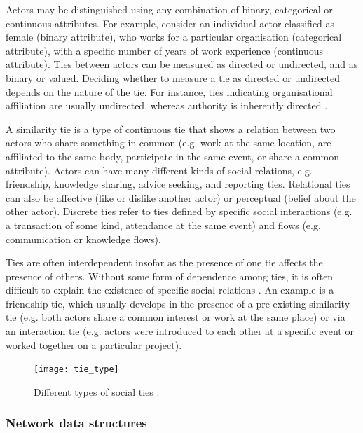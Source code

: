 Actors may be distinguished using any combination of binary, categorical or continuous attributes. For example, consider an individual actor classified as female (binary attribute), who works for a particular organisation (categorical attribute), with a specific number of years of work experience (continuous attribute). Ties between actors can be measured as directed or undirected, and as binary or valued. Deciding whether to measure a tie as directed or undirected depends on the nature of the tie. For instance, ties indicating organisational affiliation are usually undirected, whereas authority is inherently directed \citep{borgatti2013analyzing}. \medskip
 
 A similarity tie is a type of continuous tie that shows a relation between two actors who share something in common (e.g. work at the same location, are affiliated to the same body, participate in the same event, or share a common attribute). Actors can have many different kinds of social relations, e.g. friendship, knowledge sharing, advice seeking, and reporting ties. Relational ties can also be affective (like or dislike another actor) or perceptual (belief about the other actor). Discrete ties refer to ties defined by specific social interactions (e.g. a transaction of some kind, attendance at the same event) and flows (e.g. communication or knowledge flows). \medskip

Ties are often interdependent insofar as the presence of one tie affects the presence of others. Without some form of dependence among ties, it is often difficult to explain the existence of specific social relations \citep{lusher2013exponential}. An example is a friendship tie, which usually develops in the presence of a pre-existing similarity tie (e.g. both actors share a common interest or work at the same place) or via an interaction tie (e.g. actors were introduced to each other at a specific event or worked together on a particular project). \medskip

\begin{figure}
    \centering
    \texttt{[image: tie\_type]}
    \caption[Different types of social ties]{Different types of social ties \citep{borgatti2013analyzing}.}
    \label{fig:tie_type}
\end{figure}

\subsubsection{Network data structures}

